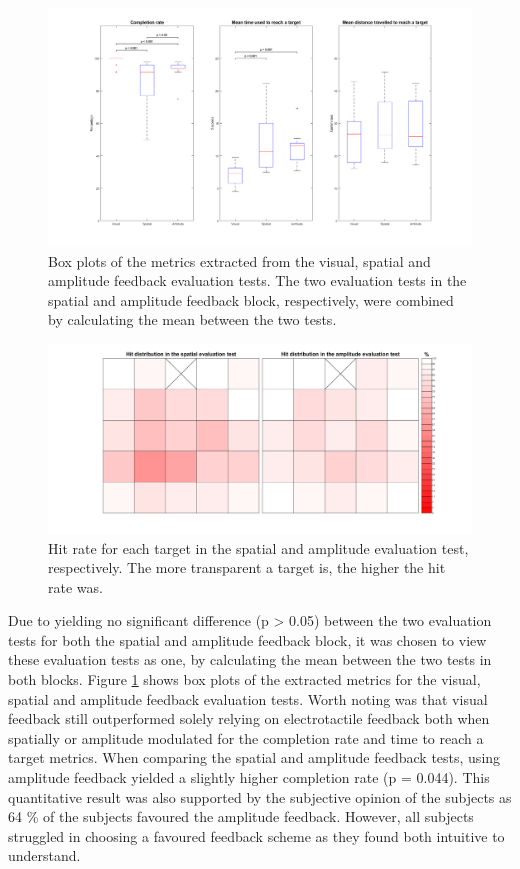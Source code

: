 \begin{figure}[t]                 
	\includegraphics[width=.8\textwidth]{figures/boxplot_results}
	\caption{Box plots of the metrics extracted from the visual, spatial and amplitude feedback evaluation tests. The two evaluation tests in the spatial and amplitude feedback block, respectively, were combined by calculating the mean between the two tests.}
	\label{fig:pa:boxplot_results} 
\end{figure}

\begin{figure}[t]                 
	\includegraphics[width=.8\textwidth]{figures/hit_dist}
	\caption{Hit rate for each target in the spatial and amplitude evaluation test, respectively. The more transparent a target is, the higher the hit rate was.}
	\label{fig:pa:hit_dist} 
\end{figure}

Due to yielding no significant difference (p > 0.05) between the two evaluation tests for both the spatial and amplitude feedback block, it was chosen to view these evaluation tests as one, by calculating the mean between the two tests in both blocks. Figure \ref{fig:pa:boxplot_results} shows box plots of the extracted metrics for the visual, spatial and amplitude feedback evaluation tests. Worth noting was that visual feedback still outperformed solely relying on electrotactile feedback both when spatially or amplitude modulated for the completion rate and time to reach a target metrics. When comparing the spatial and amplitude feedback tests, using amplitude feedback yielded a slightly higher completion rate (p = 0.044). This quantitative result was also supported by the subjective opinion of the subjects as 64 \% of the subjects favoured the amplitude feedback. However, all subjects struggled in choosing a favoured feedback scheme as they found both intuitive to understand. 

